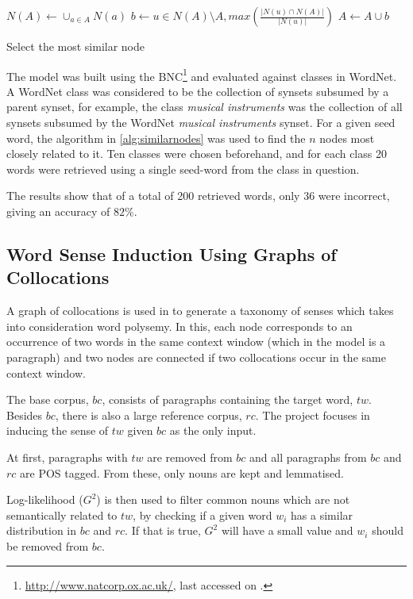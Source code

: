 \begin{algorithm}
 \begin{algorithmic}
  \State $N(A) \gets \cup_{a \in A} N(a)$
  \State $b \gets u \in N(A) \setminus A, max(\frac{|N(u) \cap N(A)|}{|N(u)|})$
  \State $A \gets A \cup b$
 \end{algorithmic}
 \caption{\label{alg:similarnodes} Select the most similar node}
\end{algorithm}

The model was built using the 
\ac{BNC}\footnote{\url{http://www.natcorp.ox.ac.uk/}, last accessed on 
.} and evaluated against classes in WordNet. A WordNet 
class was considered to be the collection of synsets subsumed by a parent 
synset, for example, the class \textit{musical instruments} was the collection 
of all synsets subsumed by the WordNet \textit{musical instruments} synset. For 
a given seed word, the algorithm in \ref{alg:similarnodes} was used 
to find the $n$ nodes most closely related to it. Ten classes were chosen 
beforehand, and for each class 20 words were retrieved using a single seed-word 
from the class in question.

The results show that of a total of 200 retrieved words, only 36 were
incorrect, giving an accuracy of $82\%$.

\subsection{Word Sense Induction Using Graphs of Collocations}
\label{sec:collocations}

A graph of collocations is used in \citep{klapaftis2008word} to generate a
taxonomy of senses which takes into consideration word polysemy. In this, each
node corresponds to an occurrence of two words in the same context window (which
in the model is a paragraph) and two nodes are connected if two collocations
occur in the same context window.

The base corpus, $bc$, consists of paragraphs containing the target word, $tw$.
Besides $bc$, there is also a large reference corpus, $rc$. The project focuses
in inducing the sense of $tw$ given $bc$ as the only input.

At first, paragraphs with $tw$ are removed from $bc$ and all paragraphs from
$bc$ and $rc$ are \ac{POS} tagged. From these, only nouns are kept and
lemmatised.

Log-likelihood ($G^2$) \citep{dunning1993accurate} is then used to filter 
common nouns which are not semantically related to $tw$, by checking if a given 
word $w_i$ has a similar distribution in $bc$ and $rc$. If that is true, $G^2$ 
will have a small value and $w_i$ should be removed from $bc$.

